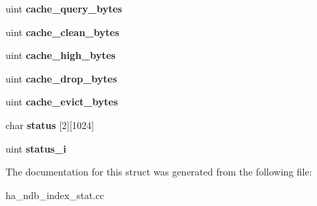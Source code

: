 \begin{DoxyCompactItemize}
\item 
\mbox{\label{structNdb__index__stat__glob_af2ddf9204a343e384eca523fdb1fa359}} 
uint {\bfseries cache\+\_\+query\+\_\+bytes}
\item 
\mbox{\label{structNdb__index__stat__glob_a84dc19e4eedb09e2f3854641e0cb3332}} 
uint {\bfseries cache\+\_\+clean\+\_\+bytes}
\item 
\mbox{\label{structNdb__index__stat__glob_a07d65748ec1b26b49c349a2dd17d23dd}} 
uint {\bfseries cache\+\_\+high\+\_\+bytes}
\item 
\mbox{\label{structNdb__index__stat__glob_a92803c8bff03f587ddecce23fae22f07}} 
uint {\bfseries cache\+\_\+drop\+\_\+bytes}
\item 
\mbox{\label{structNdb__index__stat__glob_ab196733e72aadea2bb011e85bde1dcab}} 
uint {\bfseries cache\+\_\+evict\+\_\+bytes}
\item 
\mbox{\label{structNdb__index__stat__glob_af619bcfcc5527a747b68b2f8ded83dde}} 
char {\bfseries status} \mbox{[}2\mbox{]}\mbox{[}1024\mbox{]}
\item 
\mbox{\label{structNdb__index__stat__glob_a5b6631bb4c28de17611aa40bafd8000d}} 
uint {\bfseries status\+\_\+i}
\end{DoxyCompactItemize}


The documentation for this struct was generated from the following file\+:\begin{DoxyCompactItemize}
\item 
ha\+\_\+ndb\+\_\+index\+\_\+stat.\+cc\end{DoxyCompactItemize}
